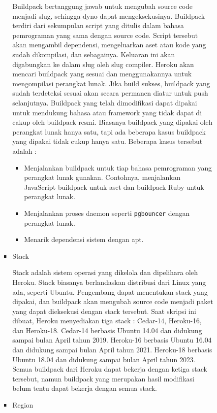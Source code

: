 \documentclass[a4paper,twoside]{article}
\begin{document}
\begin{enumerate}
\begin{itemize}
\begin{itemize}
\begin{itemize}
				Buildpack bertanggung jawab untuk mengubah source code menjadi slug, sehingga dyno dapat mengeksekusinya. Buildpack terdiri dari sekumpulan script yang ditulis dalam bahasa pemrograman yang sama dengan source code. Script tersebut akan mengambil dependensi, mengeluarkan aset atau kode yang sudah dikompilasi, dan sebagainya. Keluaran ini akan digabungkan ke dalam slug oleh slug compiler.
				Heroku akan mencari buildpack yang sesuai dan menggunakannya untuk mengompilasi perangkat lunak. Jika build sukses, buildpack yang sudah terdeteksi sesuai akan secara permanen diatur untuk push selanjutnya. Buildpack yang telah dimodifikasi dapat dipakai untuk mendukung bahasa atau framework yang tidak dapat di cakup oleh buildpack resmi.
				Biasanya buildpack yang dipakai oleh perangkat lunak hanya satu, tapi ada beberapa kasus buildpack yang dipakai tidak cukup hanya satu. Beberapa kasus tersebut adalah :
				\begin{itemize}
					\item Menjalankan buildpack untuk tiap bahasa pemrograman yang perangkat lunak gunakan. Contohnya, menjalankan JavaScript buildpack untuk aset dan buildpack Ruby untuk perangkat lunak.
					\item Menjalankan proses daemon seperti \texttt{pgbouncer} dengan perangkat lunak.
					\item Menarik dependensi sistem dengan apt.
				\end{itemize}
		
				\item Stack
		
				Stack adalah sistem operasi yang dikelola dan dipelihara oleh Heroku. Stack biasanya berlandaskan distribusi dari Linux yang ada, seperti Ubuntu. Pengembang dapat menentukan stack yang dipakai, dan buildpack akan mengubah source code menjadi paket yang dapat dieksekusi dengan stack tersebut. Saat skripsi ini dibuat, Heroku menyediakan tiga stack : Cedar-14, Heroku-16, dan Heroku-18. Cedar-14 berbasis Ubuntu 14.04 dan didukung sampai bulan April tahun 2019. Heroku-16 berbasis Ubuntu 16.04 dan didukung sampai bulan April tahun 2021. Heroku-18 berbasis Ubuntu 18.04 dan didukung sampai bulan April tahun 2023. Semua buildpack dari Heroku dapat bekerja dengan ketiga stack tersebut, namun buildpack yang merupakan hasil modifikasi belum tentu dapat bekerja dengan semua stack.
		
				\item Region
		

\end{itemize}
\end{itemize}
\end{itemize}
\end{enumerate}
\end{document}
